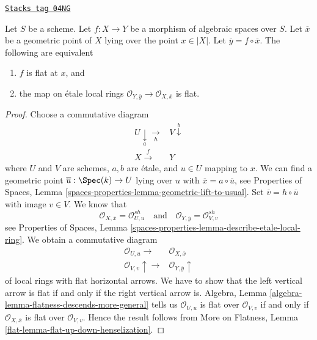 \begin{lemma}
\label{spaces-morphisms-lemma-flat-at-point-etale-local-rings}
\href{https://stacks.math.columbia.edu/tag/04NG}{\texttt{Stacks tag 04NG}}

Let $S$ be a scheme.
Let $f : X \to Y$ be a morphism of algebraic spaces over $S$.
Let $\overline{x}$ be a geometric point of $X$ lying over the point
$x \in |X|$. Let $\overline{y} = f \circ \overline{x}$. The following
are equivalent
\begin{enumerate}
\item $f$ is flat at $x$, and
\item the map on \'etale local rings
$\mathcal{O}_{Y, \overline{y}} \to \mathcal{O}_{X, \overline{x}}$
is flat.
\end{enumerate}
\end{lemma}

\begin{proof}
Choose a commutative diagram
$$
\begin{array}{cc}U \underset{a}{\downarrow}\underset{h}{\longrightarrow} & V \overset{b}{\downarrow} \\ X \overset{f}{\longrightarrow} & Y\end{array}
$$
where $U$ and $V$ are schemes, $a, b$ are \'etale, and
$u \in U$ mapping to $x$. We can find a geometric point
$\overline{u} : \Spec(k) \to U$ lying over $u$ with
$\overline{x} = a \circ \overline{u}$, see
Properties of Spaces, Lemma
\ref{spaces-properties-lemma-geometric-lift-to-usual}.
Set $\overline{v} = h \circ \overline{u}$ with image $v \in V$.
We know that
$$
\mathcal{O}_{X, \overline{x}} = \mathcal{O}_{U, u}^{sh}
\quad\text{and}\quad
\mathcal{O}_{Y, \overline{y}} = \mathcal{O}_{V, v}^{sh}
$$
see
Properties of Spaces, Lemma
\ref{spaces-properties-lemma-describe-etale-local-ring}.
We obtain a commutative diagram
$$
\begin{array}{cc}\mathcal{O}_{U, u} \longrightarrow & \mathcal{O}_{X, \overline{x}} \\ \mathcal{O}_{V, v} \uparrow\longrightarrow & \mathcal{O}_{Y, \overline{y}} \uparrow\end{array}
$$
of local rings with flat horizontal arrows. We have to show that the
left vertical arrow is flat if and only if the right vertical arrow is.
Algebra, Lemma \ref{algebra-lemma-flatness-descends-more-general}
tells us $\mathcal{O}_{U, u}$ is flat over $\mathcal{O}_{V, v}$
if and only if $\mathcal{O}_{X, \overline{x}}$ is flat over
$\mathcal{O}_{V, v}$. Hence the result follows from
More on Flatness, Lemma \ref{flat-lemma-flat-up-down-henselization}.
\end{proof}

